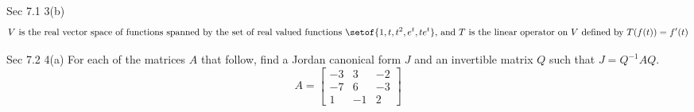 \documentclass[answers,12pt,addpoints]{exam}
\begin{document}
\begin{questions}
\begin{solution}
    \end{solution}

    \question Sec 7.1 3(b)
    $$ V \text{ is the real vector space of functions spanned by the set of real valued functions } \setof{1, t, t^2, e^t, te^t} \text{, and } T \text{ is the linear operator on } V \text{ defined by } T(f(t)) = f'(t)$$
    \begin{solution}
        
    \end{solution} 

    \question Sec 7.2 4(a)
    For each of the matrices $A$ that follow, find a Jordan canonical form $J$  and an invertible matrix $Q$ such that $J = Q^{-1}AQ$. 
    $$ A = \begin{bmatrix}
        -3 & 3 & -2 \\
        -7 & 6 & -3 \\
        1 & -1 & 2
    \end{bmatrix}$$
    \begin{solution}
        
    \end{solution}

\end{questions}
\end{document}
